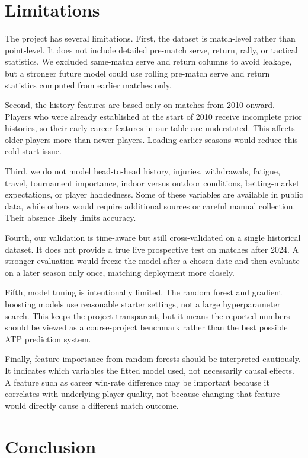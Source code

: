 \documentclass{article}
\begin{document}
\section{Limitations}
\label{sec:limitations}

The project has several limitations. First, the dataset is match-level rather than point-level. It does not include detailed pre-match serve, return, rally, or tactical statistics. We excluded same-match serve and return columns to avoid leakage, but a stronger future model could use rolling pre-match serve and return statistics computed from earlier matches only.

Second, the history features are based only on matches from 2010 onward. Players who were already established at the start of 2010 receive incomplete prior histories, so their early-career features in our table are understated. This affects older players more than newer players. Loading earlier seasons would reduce this cold-start issue.

Third, we do not model head-to-head history, injuries, withdrawals, fatigue, travel, tournament importance, indoor versus outdoor conditions, betting-market expectations, or player handedness. Some of these variables are available in public data, while others would require additional sources or careful manual collection. Their absence likely limits accuracy.

Fourth, our validation is time-aware but still cross-validated on a single historical dataset. It does not provide a true live prospective test on matches after 2024. A stronger evaluation would freeze the model after a chosen date and then evaluate on a later season only once, matching deployment more closely.

Fifth, model tuning is intentionally limited. The random forest and gradient boosting models use reasonable starter settings, not a large hyperparameter search. This keeps the project transparent, but it means the reported numbers should be viewed as a course-project benchmark rather than the best possible ATP prediction system.

Finally, feature importance from random forests should be interpreted cautiously. It indicates which variables the fitted model used, not necessarily causal effects. A feature such as career win-rate difference may be important because it correlates with underlying player quality, not because changing that feature would directly cause a different match outcome.

\section{Conclusion}
\end{document}
